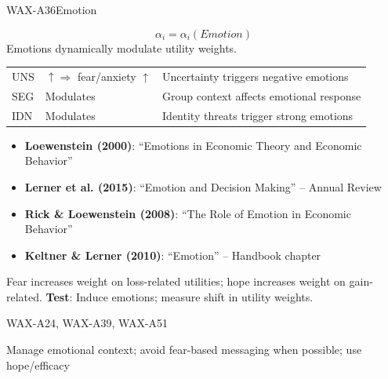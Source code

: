 \begin{axiomspec}{WAX-A36}{Emotion}

\begin{equation}
\alpha_i = \alpha_i(Emotion)
\end{equation}
Emotions dynamically modulate utility weights.

\begin{tabular}{lll}
UNS & $\uparrow \Rightarrow$ fear/anxiety $\uparrow$ & Uncertainty triggers negative emotions \\
SEG & Modulates & Group context affects emotional response \\
IDN & Modulates & Identity threats trigger strong emotions \\
\end{tabular}

\begin{itemize}
\item \textbf{Loewenstein (2000)}: ``Emotions in Economic Theory and Economic Behavior''
\item \textbf{Lerner et al. (2015)}: ``Emotion and Decision Making'' -- Annual Review
\item \textbf{Rick \& Loewenstein (2008)}: ``The Role of Emotion in Economic Behavior''
\item \textbf{Keltner \& Lerner (2010)}: ``Emotion'' -- Handbook chapter
\end{itemize}

Fear increases weight on loss-related utilities; hope increases weight on gain-related.
\textbf{Test}: Induce emotions; measure shift in utility weights.

WAX-A24, WAX-A39, WAX-A51

Manage emotional context; avoid fear-based messaging when possible; use hope/efficacy

\end{axiomspec}


